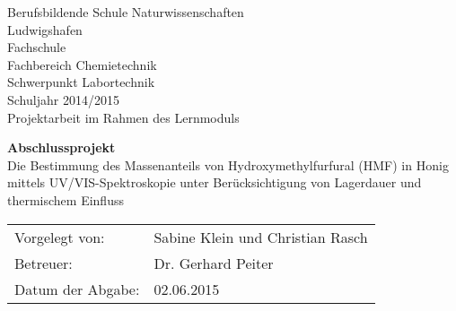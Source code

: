 \documentclass[%
11pt,                               %
liststotoc,                 %
bibtotoc,                       %
]{scrreprt}
\begin{document}
\pagestyle{empty} %
\setlength{\parindent}{0cm}

\begin{titlepage}
  \begin{center}
    \vspace*{2cm}
      \Large{Berufsbildende Schule Naturwissenschaften}\\
      \smallskip
      \Large{Ludwigshafen}\\
      \smallskip
      \Large{Fachschule}\\
      \smallskip
      \Large{Fachbereich Chemietechnik}\\
      \smallskip
      \Large{Schwerpunkt Labortechnik}\\
      \smallskip
      \Large{Schuljahr 2014/2015}\\
      \smallskip
      \Large{Projektarbeit im Rahmen des Lernmoduls}
      \smallskip

    \vspace{1cm}

    \vspace{0.5\baselineskip} {\Huge \textbf{Abschlussprojekt}\\\vspace{2cm} \huge Die Bestimmung des Massenanteils von Hydroxymethylfurfural (HMF) in Honig mittels UV/VIS-Spektroskopie unter Berücksichtigung von Lagerdauer und thermischem Einfluss}
  \end{center}

  \vfill

  {\large
    \begin{tabular}[l]{ll}
      Vorgelegt von: & Sabine Klein und Christian Rasch\\
      Betreuer: & Dr. Gerhard Peiter\\
      Datum der Abgabe: & 02.06.2015
    \end{tabular}
  }

\end{titlepage}




\end{document}
